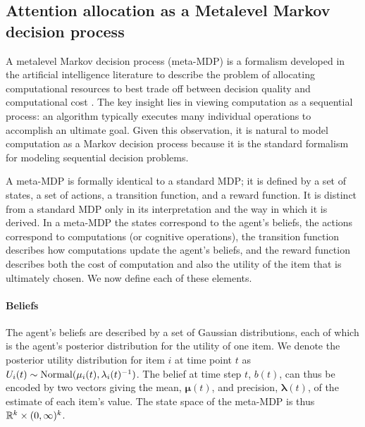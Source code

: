 \documentclass[11pt]{article} %
\begin{document}

\subsection{Attention allocation as a Metalevel Markov decision process}
A metalevel Markov decision process (meta-MDP) is a formalism developed in the artificial intelligence literature to describe the problem of allocating computational resources to best trade off between decision quality and computational cost \citep{Hay2012}. The key insight lies in viewing computation as a sequential process: an algorithm typically executes many individual operations to accomplish an ultimate goal. Given this observation, it is natural to model computation as a Markov decision process because it is the standard formalism for modeling sequential decision problems.

A meta-MDP is formally identical to a standard MDP; it is defined by a set of states, a set of actions, a transition function, and a reward function. It is distinct from a standard MDP only in its interpretation and the way in which it is derived. In a meta-MDP the states correspond to the agent's beliefs, the actions correspond to computations (or cognitive operations), the transition function describes how computations update the agent's beliefs, and the reward function describes both the cost of computation and also the utility of the item that is ultimately chosen.
We now define each of these elements.


\paragraph{Beliefs}
The agent's beliefs are described by a set of Gaussian distributions, each of which is the agent's posterior distribution for the utility of one item. We denote the posterior utility distribution for item $i$ at time point $t$ as $U_i(t) \sim \mathrm{Normal}(\mu_i(t), \lambda_i(t)^{-1})$. The belief at time step $t$, $b(t)$, can thus be encoded by two vectors giving the mean, $\boldsymbol{\mu}(t)$, and precision, $\boldsymbol{\lambda}(t)$, of the estimate of each item's value. The state space of the meta-MDP is thus $\mathbb{R}^k \times (0,\infty)^k$.
\end{document}
